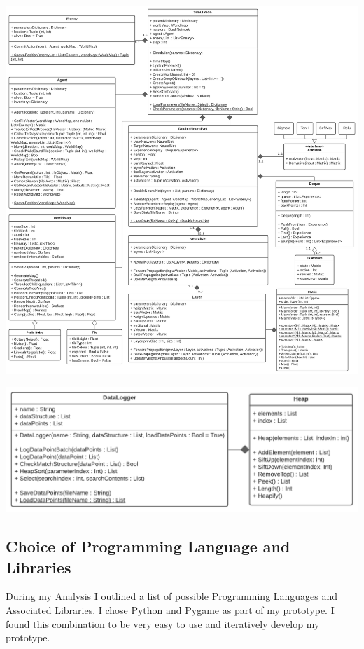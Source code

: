 \begin{flushleft}
            \vspace{0.5cm}
            \centerline{\includegraphics[width=\textwidth]{Images/Design/ClassDiagram.png}}
            \vspace{0.5cm}
            \centerline{\includegraphics[width=.65\textwidth]{Images/Design/DataLoggerDiagram.png}}
            \vspace{0.5cm}

        \subsection{Choice of Programming Language and Libraries}
            \large
            \vspace{0.2cm}  
            During my Analysis I outlined a list of possible Programming Languages and Associated Libraries. I chose Python
            and Pygame as part of my prototype. I found this combination to be very easy to use and iteratively develop my prototype. \\


\end{flushleft}
